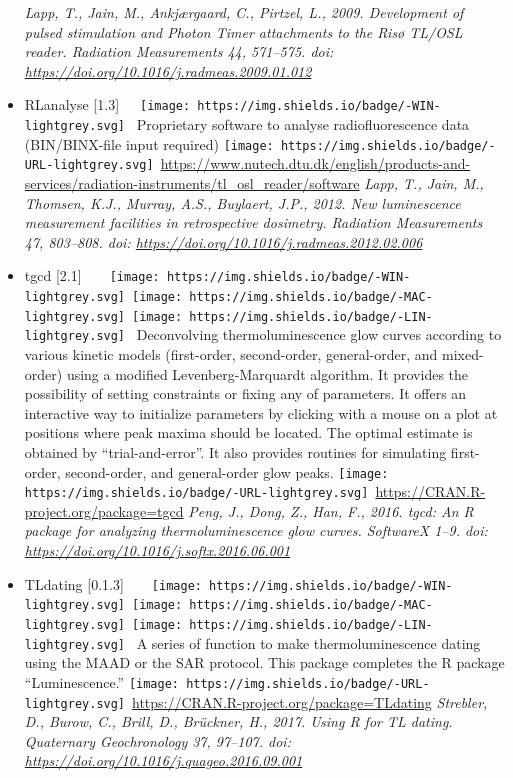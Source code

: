 \documentclass[]{article}
\begin{document}
\begin{itemize}
  \emph{Lapp, T., Jain, M., Ankjærgaard, C., Pirtzel, L., 2009. Development of pulsed stimulation and Photon Timer attachments to the Risø TL/OSL reader. Radiation Measurements 44, 571--575. doi: \url{https://doi.org/10.1016/j.radmeas.2009.01.012}}
\item
  RLanalyse {[}1.3{]}~~~\texttt{[image: https://img.shields.io/badge/-WIN-lightgrey.svg]}~
  Proprietary software to analyse radiofluorescence data (BIN/BINX-file input required)
  \texttt{[image: https://img.shields.io/badge/-URL-lightgrey.svg]}~\url{https://www.nutech.dtu.dk/english/products-and-services/radiation-instruments/tl_osl_reader/software}
  \emph{Lapp, T., Jain, M., Thomsen, K.J., Murray, A.S., Buylaert, J.P., 2012. New luminescence measurement facilities in retrospective dosimetry. Radiation Measurements 47, 803--808. doi: \url{https://doi.org/10.1016/j.radmeas.2012.02.006}}
\item
  tgcd {[}2.1{]}~~~~\texttt{[image: https://img.shields.io/badge/-WIN-lightgrey.svg]}~\texttt{[image: https://img.shields.io/badge/-MAC-lightgrey.svg]}~\texttt{[image: https://img.shields.io/badge/-LIN-lightgrey.svg]}~
  Deconvolving thermoluminescence glow curves according to various
  kinetic models (first-order, second-order, general-order, and mixed-order) using
  a modified Levenberg-Marquardt algorithm. It provides the possibility of setting
  constraints or fixing any of parameters. It offers an interactive way to initialize
  parameters by clicking with a mouse on a plot at positions where peak maxima should
  be located. The optimal estimate is obtained by ``trial-and-error''. It also provides
  routines for simulating first-order, second-order, and general-order glow peaks.
  \texttt{[image: https://img.shields.io/badge/-URL-lightgrey.svg]}~\url{https://CRAN.R-project.org/package=tgcd}
  \emph{Peng, J., Dong, Z., Han, F., 2016. tgcd: An R package for analyzing thermoluminescence glow curves. SoftwareX 1--9. doi: \url{https://doi.org/10.1016/j.softx.2016.06.001}}
\item
  TLdating {[}0.1.3{]}~~~~\texttt{[image: https://img.shields.io/badge/-WIN-lightgrey.svg]}~\texttt{[image: https://img.shields.io/badge/-MAC-lightgrey.svg]}~\texttt{[image: https://img.shields.io/badge/-LIN-lightgrey.svg]}~
  A series of function to make thermoluminescence dating using the MAAD or the SAR protocol.
  This package completes the R package ``Luminescence.''
  \texttt{[image: https://img.shields.io/badge/-URL-lightgrey.svg]}~\url{https://CRAN.R-project.org/package=TLdating}
  \emph{Strebler, D., Burow, C., Brill, D., Brückner, H., 2017. Using R for TL dating. Quaternary Geochronology 37, 97--107. doi: \url{https://doi.org/10.1016/j.quageo.2016.09.001}}
\end{itemize}
\end{document}
